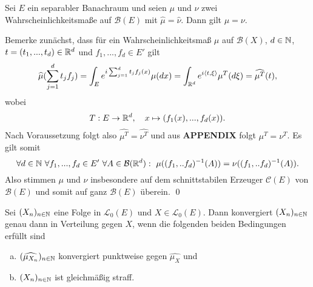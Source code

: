 \begin{theorem}[Eindeutigkeitssatz]
    Sei $E$ ein separabler Banachraum und seien $\mu$ und $\nu$ zwei Wahrscheinlichkeitsmaße auf $\mathcal{B}(E)$ mit $\widehat{\mu} = \widehat{\nu}$. Dann gilt $\mu = \nu$.
\end{theorem}

\begin{proof*}
    Bemerke zunächst, dass für ein Wahrscheinlichkeitsmaß $\mu$ auf $\mathcal{B}(X)$, $d \in  \mathbb{N}$, $t=(t_1,...,t_d) \in \mathbb{R}^d$ und $f_1,..., f_d \in E'$ gilt
    $$
        \widehat{\mu}(\sum_{j=1}^d t_j f_j) = \int_E e^{i\sum_{j=1}^dt_jf_j(x)}\mu(dx) = \int_{\mathbb{R}^d} e^{i\langle t, \xi \rangle}\mu^T(d\xi) = \widehat{\mu^T}(t),
    $$
    wobei 
    $$
        T: E \to \mathbb{R}^d, \quad x \mapsto (f_1(x),...,f_d(x)). 
    $$
    Nach Voraussetzung folgt also $\widehat{\mu^T} = \widehat{\nu^T}$ und aus \textbf{APPENDIX} folgt $\mu^T = \nu^T$. 
    Es gilt somit
    $$
        \forall d\in \N \ \forall f_1,...,f_d \in E' \ \forall A \in \mathcal{B}(\R^d): \ \mu((f_1,..f_d)^{-1}(A)) =  \nu((f_1,..f_d)^{-1}(A)). 
    $$
    Also stimmen $\mu$ und $\nu$ insbesondere auf dem schnittstabilen Erzeuger $\mathcal{C}(E)$ von $\mathcal{B}(E)$ und somit auf ganz $\mathcal{B}(E)$ überein. \qed
\end{proof*}

\begin{theorem}
    Sei $(X_n)_{n \in \mathbb{N}}$ eine Folge in $\mathcal{L}_0(E)$ und $X \in \mathcal{L}_0(E)$. 
    Dann konvergiert $(X_n)_{n \in \mathbb{N}}$ genau dann in Verteilung gegen $X$, wenn die folgenden beiden Bedingungen erfüllt sind
    \begin{enumerate}[(a)]
        \item $(\widehat{\mu_{X_n}})_{n \in \mathbb{N}}$ konvergiert punktweise gegen $\widehat{\mu_X}$ und
        \item $(X_n)_{n \in \mathbb{N}}$ ist gleichmäßig straff. 
    \end{enumerate}
\end{theorem}

